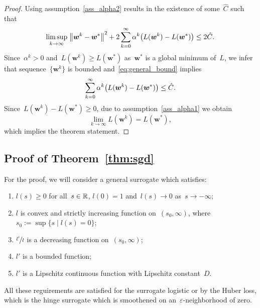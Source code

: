 \begin{proof}
  Using assumption~\ref{ass_alpha2} results in the existence of some~$\hat{C}$ such that
  \begin{equation}\label{eq:general_bound}
  \limsup_{k \rightarrow \infty} \;\norm{\bm{w}^k - \bm{w}^*}^2 + 2\sum_{k=0}^\infty \alpha^k \Brac{L(\bm{w}^k) - L(\bm{w}^*)} \leq 2 \hat{C}.
  \end{equation}
  Since~$\alpha^k > 0$ and~$L(\bm{w}^k) \geq L(\bm{w}^*)$ as~$\bm{w}^*$ is a global minimum of~$L$, we infer that sequence~$\{\bm{w}^k\}$ is bounded and~\eqref{eq:general_bound} implies
  \begin{equation*}
    \sum_{k=0}^\infty \alpha^k \Brac{L(\bm{w}^k) - L(\bm{w}^*)} \leq \hat{C}.
  \end{equation*}
  Since~$L(\bm{w}^k) - L(\bm{w}^*) \geq 0$, due to assumption~\ref{ass_alpha1} we obtain
  \begin{equation*}
    \lim_{k \to \infty} L(\bm{w}^k) = L(\bm{w}^*),
  \end{equation*}
  which implies the theorem statement.
\end{proof}

\subsection{Proof of Theorem~\ref{thm:sgd}}\label{app:sgd2}

For the proof, we will consider a general surrogate which satisfies:
\begin{enumerate}[label={(S\arabic*)}]
  \item \label{surr_basic1} $l(s)\geq 0$ for all~$s\in\mathbb{R}$, $l(0)=1$ and~$l(s)\to 0$ as~$s\to-\infty$;
  \item \label{surr_basic2} $l$ is convex and strictly increasing function on~$(s_0,\infty)$, where~$s_0:=\sup\{s \mid l(s)=0\}$;
  \item \label{surr_ratio} $\nicefrac{l'}{l}$ is a decreasing function on~$(s_0,\infty)$;
  \item \label{surr_der1} $l'$ is a bounded function;
  \item \label{surr_der2} $l'$ is a Lipschitz continuous function with Lipschitz constant~$D$.
\end{enumerate}
All these reguirements are satisfied for the surrogate logistic or by the Huber loss, which is the hinge surrogate which is smoothened on an~$\varepsilon$-neighborhood of zero.

